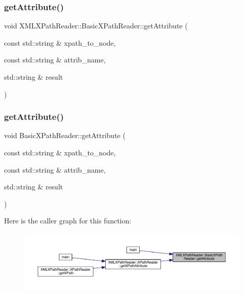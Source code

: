 \subsubsection{\texorpdfstring{getAttribute()}{getAttribute()}\hspace{0.1cm}{\footnotesize\ttfamily [2/30]}}
{\footnotesize\ttfamily void X\+M\+L\+X\+Path\+Reader\+::\+Basic\+X\+Path\+Reader\+::get\+Attribute (\begin{DoxyParamCaption}\item[{const std\+::string \&}]{xpath\+\_\+to\+\_\+node,  }\item[{const std\+::string \&}]{attrib\+\_\+name,  }\item[{std\+::string \&}]{result }\end{DoxyParamCaption})}

\mbox{\label{classXMLXPathReader_1_1BasicXPathReader_ab35c63e2c1b2dad0485f9272f3d03ed6}} 
\subsubsection{\texorpdfstring{getAttribute()}{getAttribute()}\hspace{0.1cm}{\footnotesize\ttfamily [3/30]}}
{\footnotesize\ttfamily void Basic\+X\+Path\+Reader\+::get\+Attribute (\begin{DoxyParamCaption}\item[{const std\+::string \&}]{xpath\+\_\+to\+\_\+node,  }\item[{const std\+::string \&}]{attrib\+\_\+name,  }\item[{std\+::string \&}]{result }\end{DoxyParamCaption})}

Here is the caller graph for this function\+:
\nopagebreak
\begin{figure}[H]
\begin{center}
\leavevmode
\includegraphics[width=350pt]{d6/dbf/classXMLXPathReader_1_1BasicXPathReader_ab35c63e2c1b2dad0485f9272f3d03ed6_icgraph}
\end{center}
\end{figure}
\mbox{\label{classXMLXPathReader_1_1BasicXPathReader_a198279405bb6f7cbef71708ece30155d}} 
